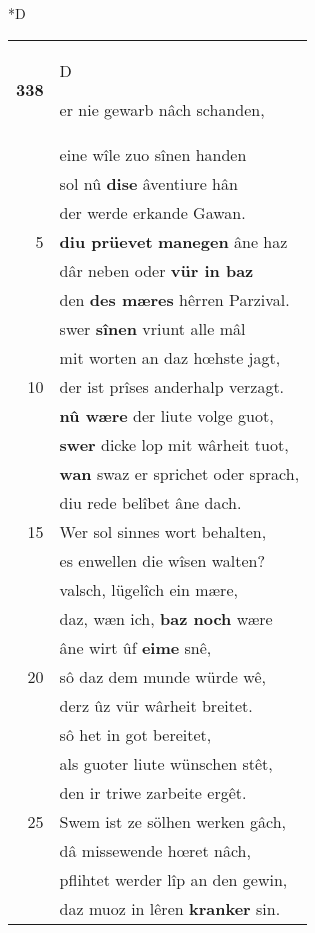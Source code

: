 \documentclass[8pt,a4paper,notitlepage]{article}
\begin{document}
\begin{table}[ht]
\begin{minipage}[t]{0.5\linewidth}
\small
\begin{center}*D
\end{center}
\begin{tabular}{rl}
\textbf{338} & \begin{large}D\end{large}er nie gewarb nâch schanden,\\ 
 & eine wîle zuo sînen handen\\ 
 & sol nû \textbf{dise} âventiure hân\\ 
 & der werde erkande Gawan.\\ 
5 & \textbf{diu prüevet} \textbf{manegen} âne haz\\ 
 & dâr neben oder \textbf{vür in baz}\\ 
 & den \textbf{des mæres} hêrren Parzival.\\ 
 & swer \textbf{sînen} vriunt alle mâl\\ 
 & mit worten an daz hœhste jagt,\\ 
10 & der ist prîses anderhalp verzagt.\\ 
 & \textbf{nû wære} der liute volge guot,\\ 
 & \textbf{swer} dicke lop mit wârheit tuot,\\ 
 & \textbf{wan} swaz er sprichet oder sprach,\\ 
 & diu rede belîbet âne dach.\\ 
15 & Wer sol sinnes wort behalten,\\ 
 & es enwellen die wîsen walten?\\ 
 & valsch, lügelîch ein mære,\\ 
 & daz, wæn ich, \textbf{baz noch} wære\\ 
 & âne wirt ûf \textbf{eime} snê,\\ 
20 & sô daz dem munde würde wê,\\ 
 & derz ûz vür wârheit breitet.\\ 
 & sô het in got bereitet,\\ 
 & als guoter liute wünschen stêt,\\ 
 & den ir triwe zarbeite ergêt.\\ 
25 & Swem ist ze sölhen werken gâch,\\ 
 & dâ missewende hœret nâch,\\ 
 & pflihtet werder lîp an den gewin,\\ 
 & daz muoz in lêren \textbf{kranker} sin.\\ 

\end{tabular}
\end{minipage}
\end{table}
\end{document}
